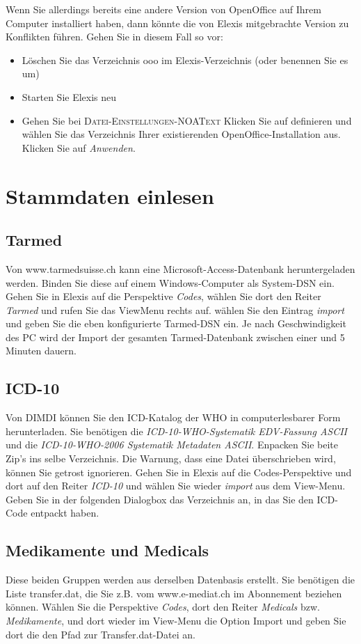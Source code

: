 Wenn Sie allerdings bereits eine andere Version von OpenOffice auf Ihrem Computer installiert haben, dann könnte die von Elexis mitgebrachte Version zu Konflikten führen. Gehen Sie in diesem Fall so vor:
\begin{itemize}
\item Löschen Sie das Verzeichnis ooo im Elexis-Verzeichnis (oder benennen Sie es um)
\item Starten Sie Elexis neu
\item Gehen Sie bei \textsc{Datei-Einstellungen-NOAText} Klicken Sie auf \glqq definieren\grqq{} und wählen Sie das Verzeichnis Ihrer existierenden OpenOffice-Installation aus. Klicken Sie auf \textit{Anwenden}.

\end{itemize}
\section{Stammdaten einlesen}
\subsection{Tarmed}
Von www.tarmedsuisse.ch kann eine Microsoft-Access-Datenbank heruntergeladen werden. Binden Sie diese auf einem Windows-Computer als System-DSN ein. Gehen Sie in Elexis auf die Perspektive \textit{Codes}, wählen Sie dort den Reiter \textit{Tarmed} und rufen Sie das ViewMenu rechts auf. wählen Sie den Eintrag \textit{import} und geben Sie die eben konfigurierte Tarmed-DSN ein. Je nach Geschwindigkeit des PC wird der Import der gesamten Tarmed-Datenbank zwischen einer und 5 Minuten dauern.
\subsection{ICD-10}
Von DIMDI können Sie den ICD-Katalog der WHO in computerlesbarer Form herunterladen. Sie benötigen die \textit{ICD-10-WHO-Systematik EDV-Fassung ASCII} und die \textit{ICD-10-WHO-2006 Systematik Metadaten ASCII}. Enpacken Sie beite Zip's ins selbe Verzeichnis. Die Warnung, dass eine Datei überschrieben wird, können Sie getrost ignorieren. Gehen Sie in Elexis auf die Codes-Perspektive und dort auf den Reiter \textit{ICD-10} und wählen Sie wieder \textit{import} aus dem View-Menu. Geben Sie in der folgenden Dialogbox das Verzeichnis an, in das Sie den ICD-Code entpackt haben.
\subsection{Medikamente und Medicals}
Diese beiden Gruppen werden aus derselben Datenbasis erstellt. Sie benötigen die Liste transfer.dat, die Sie z.B. vom www.e-mediat.ch im Abonnement beziehen können. Wählen Sie die Perspektive \textit{Codes}, dort den Reiter \textit{Medicals} bzw. \textit{Medikamente}, und dort wieder im View-Menu die Option Import und geben Sie dort die den Pfad zur Transfer.dat-Datei an.
